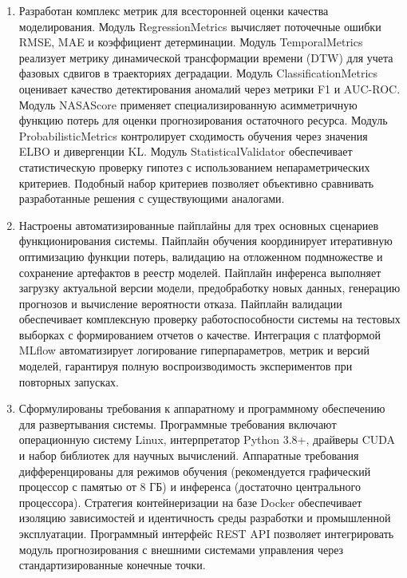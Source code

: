 \documentclass[14pt, a4paper, oneside]{extreport}
\begin{document}
\begin{enumerate}
\item Разработан комплекс метрик для всесторонней оценки качества моделирования. Модуль {RegressionMetrics} вычисляет поточечные ошибки RMSE, MAE и коэффициент детерминации. Модуль {TemporalMetrics} реализует метрику динамической трансформации времени (DTW) для учета фазовых сдвигов в траекториях деградации. Модуль {ClassificationMetrics} оценивает качество детектирования аномалий через метрики F1 и AUC-ROC. Модуль {NASAScore} применяет специализированную асимметричную функцию потерь для оценки прогнозирования остаточного ресурса. Модуль {ProbabilisticMetrics} контролирует сходимость обучения через значения ELBO и дивергенции KL. Модуль {StatisticalValidator} обеспечивает статистическую проверку гипотез с использованием непараметрических критериев. Подобный набор критериев позволяет объективно сравнивать разработанные решения с существующими аналогами.

\item Настроены автоматизированные пайплайны для трех основных сценариев функционирования системы. Пайплайн обучения координирует итеративную оптимизацию функции потерь, валидацию на отложенном подмножестве и сохранение артефактов в реестр моделей. Пайплайн инференса выполняет загрузку актуальной версии модели, предобработку новых данных, генерацию прогнозов и вычисление вероятности отказа. Пайплайн валидации обеспечивает комплексную проверку работоспособности системы на тестовых выборках с формированием отчетов о качестве. Интеграция с платформой MLflow автоматизирует логирование гиперпараметров, метрик и версий моделей, гарантируя полную воспроизводимость экспериментов при повторных запусках.

\item Сформулированы требования к аппаратному и программному обеспечению для развертывания системы. Программные требования включают операционную систему Linux, интерпретатор Python 3.8+, драйверы CUDA и набор библиотек для научных вычислений. Аппаратные требования дифференцированы для режимов обучения (рекомендуется графический процессор с памятью от 8 ГБ) и инференса (достаточно центрального процессора). Стратегия контейнеризации на базе Docker обеспечивает изоляцию зависимостей и идентичность среды разработки и промышленной эксплуатации. Программный интерфейс REST API позволяет интегрировать модуль прогнозирования с внешними системами управления через стандартизированные конечные точки.
\end{enumerate}
\end{document}
